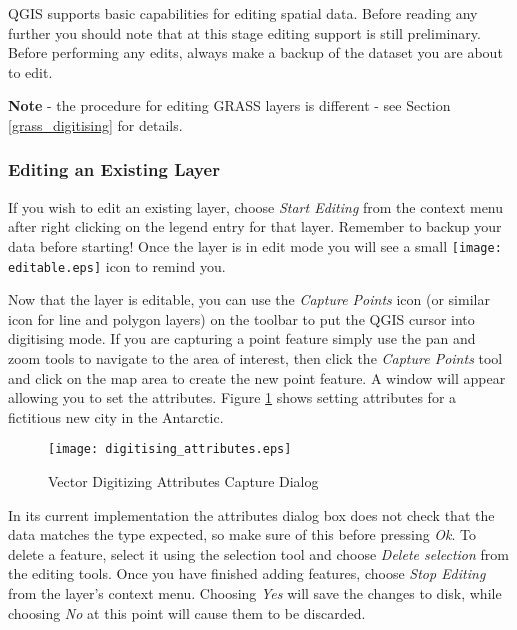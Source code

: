 QGIS supports basic capabilities for editing spatial data.  Before reading any
further you should note that at this stage editing support is still
preliminary.
Before performing any edits, always make a backup of the dataset you are about
to edit. 

\textbf{Note} - the procedure for editing GRASS layers is different - see
Section \ref{grass_digitising} for details.

\subsubsection{Editing an Existing Layer}
\label{sec:edit_existing_layer}

If you wish to edit an existing layer, choose \textit{Start Editing} from the
context menu after right clicking on the legend entry for that layer. Remember
to backup your data before starting! Once the layer is in edit mode you will
see a small \texttt{[image: editable.eps]} icon to remind
you.

Now that the layer is editable, you can use the \textit{Capture Points} icon
(or
similar icon for line and polygon layers) on the toolbar to put the QGIS
cursor
into digitising mode. If you are capturing a point feature simply use the pan
and zoom tools to navigate to the area of interest, then click the
\textit{Capture Points} tool and click on the map area to create the  
new point feature. A window will appear allowing you to set the attributes.
Figure \ref{fig:vector_digitising} shows setting attributes for a fictitious
new city in the Antarctic.

\begin{figure}[ht]
   \begin{center}
   \caption{Vector Digitizing Attributes Capture
Dialog}\label{fig:vector_digitising}\smallskip
   \texttt{[image: digitising\_attributes.eps]}
\end{center}  
\end{figure}

In its current implementation the attributes dialog box does not check that
the
data matches the type expected, so make sure of this before
pressing \textit{Ok}. To delete a feature, select it using the selection tool
and choose \textit{Delete selection} from the editing tools. Once you have
finished adding features, choose \textit{Stop Editing} from the
layer's context menu. Choosing \textit{Yes} will save the changes to disk,
while choosing \textit{No} at this point will cause them to be discarded.

